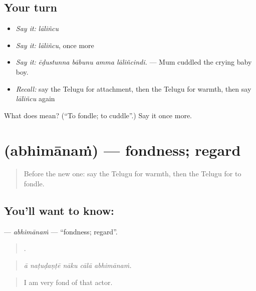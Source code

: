 \subsection*{Your turn}
\begin{itemize}
\raggedright
  \item \emph{Say it:} \emph{lāliñcu}
  \item \emph{Say it:} \emph{lāliñcu}, once more
  \item \emph{Say it:} \emph{ēḍustunna bābunu amma lāliñcindi.} — Mum cuddled the crying baby boy.
  \item \emph{Recall:} say the Telugu for attachment, then the Telugu for warmth, then say \emph{lāliñcu} again
\end{itemize}

\begin{tcolorbox}[breakable,colback=teal!4,colframe=teal!35!black,title={Before you move on}]
What does  mean? (\textquotedblleft{}To fondle; to cuddle\textquotedblright{}.) Say it once more.
\end{tcolorbox}
\section[\texorpdfstring{\te{అభిమానం} (abhimānaṁ)}{అభిమానం (abhimānaṁ)}]{ (abhimānaṁ) — fondness; regard}

\label{lesson:TE-C503-abhimanam}



\begin{quote}
Before the new one: say the Telugu for warmth, then the Telugu for to fondle.
\end{quote}

\subsection*{You'll want to know: }
\textbf{} — \emph{abhimānaṁ} — \textquotedblleft{}fondness; regard\textquotedblright{}.

\begin{quote}
    .
\end{quote}

\begin{quote}
\emph{ā naṭuḍaṇṭē nāku cālā abhimānaṁ.}
\end{quote}

\begin{quote}
I am very fond of that actor.
\end{quote}

